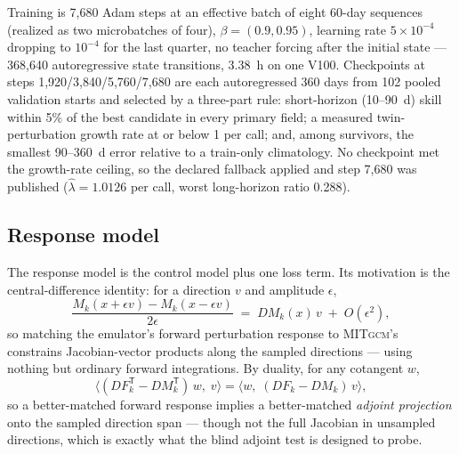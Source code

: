 \documentclass[3p,12pt]{elsarticle}
\newcommand{\MITgcm}{\textsc{MITgcm}}
\begin{document}
Training is 7{,}680 Adam steps at an effective batch of eight 60-day sequences
(realized as two microbatches of four), $\beta=(0.9,0.95)$, learning rate
$5\times10^{-4}$ dropping to $10^{-4}$ for the last quarter, no teacher forcing
after the initial state --- 368{,}640 autoregressive state transitions, 3.38~h on
one V100. Checkpoints at steps 1{,}920/3{,}840/5{,}760/7{,}680 are each
autoregressed 360 days from 102 pooled validation starts and selected by a
three-part rule: short-horizon (10--90~d) skill within 5\% of the best candidate
in every primary field; a measured twin-perturbation growth rate at or below 1
per call; and, among survivors, the smallest 90--360~d error relative to a
train-only climatology. No checkpoint met the growth-rate ceiling, so the
declared fallback applied and step 7{,}680 was published
($\hat\lambda=1.0126$ per call, worst long-horizon ratio 0.288).

\subsection{Response model}
\label{sec:response}

The response model is the control model plus one loss term. Its motivation is
the central-difference identity: for a direction $v$ and amplitude $\epsilon$,
\begin{equation}
\frac{M_k(x+\epsilon v)-M_k(x-\epsilon v)}{2\epsilon}
\;=\; DM_k(x)\,v \;+\; O(\epsilon^2),
\label{eq:cd}
\end{equation}
so matching the emulator's forward perturbation response to \MITgcm{}'s
constrains Jacobian-vector products along the sampled directions --- using
nothing but ordinary forward integrations. By duality, for any cotangent $w$,
\begin{equation}
\bigl\langle (DF_k^{\mathsf T}-DM_k^{\mathsf T})\,w,\;v\bigr\rangle
=\bigl\langle w,\;(DF_k-DM_k)\,v\bigr\rangle,
\label{eq:duality}
\end{equation}
so a better-matched forward response implies a better-matched \emph{adjoint
projection} onto the sampled direction span --- though not the full Jacobian in
unsampled directions, which is exactly what the blind adjoint test is designed
to probe.
\end{document}
